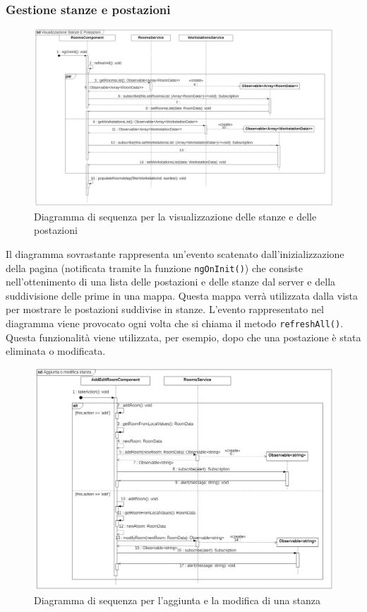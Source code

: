 \subsubsection{Gestione stanze e postazioni}
\begin{figure}[H]
	\centering
	\includegraphics[width=18cm]{res/images/webapp-visualStanzePostazioni-diagrammaSequenza.png}
	\caption{Diagramma di sequenza per la visualizzazione delle stanze e delle postazioni}
	\label{fig:DiagrammaSequenzaStanzePostazioni1}
\end{figure}
Il diagramma sovrastante rappresenta un'evento scatenato dall'inizializzazione della pagina (notificata tramite la funzione \texttt{ngOnInit()}) che consiste nell'ottenimento di una lista delle postazioni e delle stanze dal server e della suddivisione delle prime in una mappa. Questa mappa verrà utilizzata dalla vista per mostrare le postazioni suddivise in stanze. L'evento rappresentato nel diagramma viene provocato ogni volta che si chiama il metodo \texttt{refreshAll()}. Questa funzionalità viene utilizzata, per esempio, dopo che una postazione è stata eliminata o modificata.
\begin{figure}[H]
	\centering
	\includegraphics[width=18cm]{res/images/webapp-addEditStanzePostazioni-diagrammaSequenza.png}
	\caption{Diagramma di sequenza per l'aggiunta e la modifica di una stanza}
	\label{fig:DiagrammaSequenzaStanzePostazioni2}
\end{figure}
